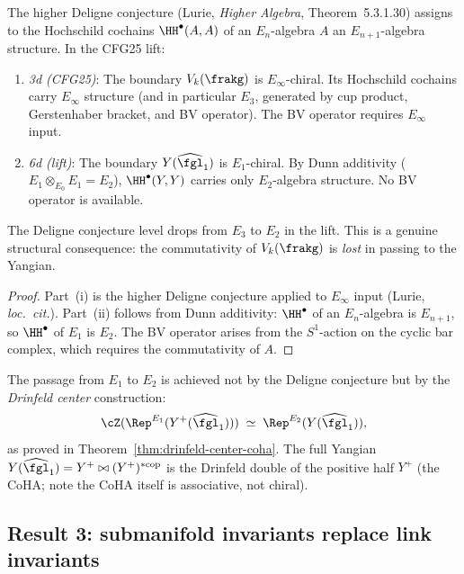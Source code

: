 \begin{proposition}
\label{prop:deligne-level-drop-cfg25}
The higher Deligne conjecture (Lurie, \emph{Higher Algebra}, Theorem~5.3.1.30) assigns to the Hochschild cochains $\HH^\bullet(A, A)$ of an $E_n$-algebra $A$ an $E_{n+1}$-algebra structure. In the CFG25 lift:
\begin{enumerate}[label=\textup{(\roman*)}]
 \item \emph{3d (CFG25)}: The boundary $V_k(\frakg)$ is $E_\infty$-chiral. Its Hochschild cochains carry $E_\infty$ structure (and in particular $E_3$, generated by cup product, Gerstenhaber bracket, and BV operator). The BV operator requires $E_\infty$ input.
 \item \emph{6d (lift)}: The boundary $Y(\widehat{\fgl}_1)$ is $E_1$-chiral. By Dunn additivity ($E_1 \otimes_{E_0} E_1 = E_2$), $\HH^\bullet(Y, Y)$ carries only $E_2$-algebra structure. No BV operator is available.
\end{enumerate}
The Deligne conjecture level drops from $E_3$ to $E_2$ in the lift. This is a genuine structural consequence: the commutativity of $V_k(\frakg)$ is \emph{lost} in passing to the Yangian.
\end{proposition}

\begin{proof}
Part~(i) is the higher Deligne conjecture applied to $E_\infty$ input (Lurie, \emph{loc.\ cit.}). Part~(ii) follows from Dunn additivity: $\HH^\bullet$ of an $E_n$-algebra is $E_{n+1}$, so $\HH^\bullet$ of $E_1$ is $E_2$. The BV operator arises from the $S^1$-action on the cyclic bar complex, which requires the commutativity of $A$.
\end{proof}

The passage from $E_1$ to $E_2$ is achieved not by the Deligne conjecture but by the \emph{Drinfeld center} construction:
\begin{equation}\label{eq:drinfeld-e1-to-e2-cfg25}
 \cZ(\Rep^{E_1}(Y^+(\widehat{\fgl}_1))) \;\simeq\; \Rep^{E_2}(Y(\widehat{\fgl}_1)),
\end{equation}
as proved in Theorem~\ref{thm:drinfeld-center-coha}. The full Yangian $Y(\widehat{\fgl}_1) = Y^+ \bowtie (Y^+)^{*\mathrm{cop}}$ is the Drinfeld double of the positive half $Y^+$ (the CoHA; note the CoHA itself is associative, not chiral).

\subsection{Result 3: submanifold invariants replace link invariants}
\label{subsec:cfg25-result3}

